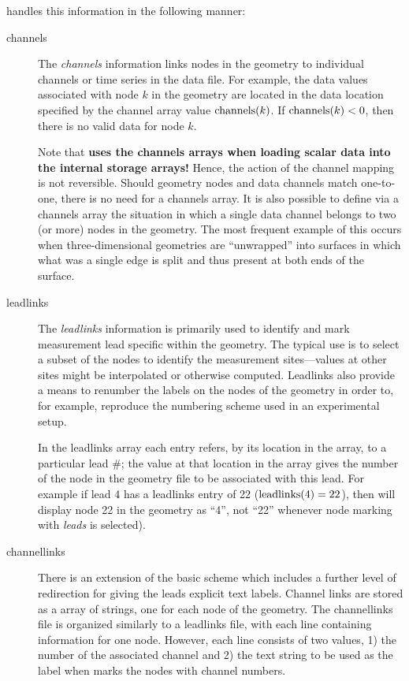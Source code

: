 \map{} handles this information in the following manner:
%
\begin{description}
  \item [channels]  The {\em channels\/} information links 
        nodes in the geometry to individual channels or time series in the
        data file.  For example, the data values associated with node
        $k$ in the geometry are located in the data location specified by
        the channel array value ${\rm channels}(k)$.  If ${\rm channels}(k)
        < 0$, then there is no valid data for node $k$.

        Note that \textbf{ \map{} uses the channels arrays when
        loading scalar data into the internal storage arrays!}  Hence, the
        action of the channel mapping is not reversible.   Should geometry
        nodes and data channels match one-to-one, there is no need for a
        channels array.  It is also possible to define via a channels array
        the situation in which a single data channel belongs to two (or
        more) nodes in the geometry.  The most frequent example of this
        occurs when three-dimensional geometries are ``unwrapped'' into
        surfaces in which what was a single edge is split and thus present
        at both ends of the surface.

  \item [leadlinks] The {\em leadlinks\/} information is primarily
        used to identify and mark measurement lead specific within the
        geometry.  The typical use is to select a subset of the nodes to
        identify the measurement sites---values at other sites might
        be interpolated or otherwise computed.  Leadlinks also provide a
        means to renumber the labels on the nodes of the geometry in order
        to, for example, reproduce the numbering scheme used in an
        experimental setup.
        
        In the leadlinks array each entry refers, by its location in the
        array, to a particular lead \#; the value at that location in the
        array gives the number of the node in the geometry file to be
        associated with this lead.  For example if lead 4 has a leadlinks
        entry of 22 (${\rm leadlinks}(4)=22$), then \map{} will display
        node 22 in the geometry as ``4'', not ``22'' whenever node marking
        with \emph{leads} is selected).

  \item [channellinks] There is an extension of the basic scheme which
        includes a further level of redirection for giving the leads
        explicit text labels.  Channel links are stored as a array of
        strings, one for each node of the geometry.  The channellinks file
        is organized similarly to a leadlinks file, with each line
        containing information for one node.  However, each line consists
        of two values, 1) the number of the associated channel and 2) the
        text string to be used as the label when \map{} marks the nodes
        with channel numbers.
        

\end{description}
